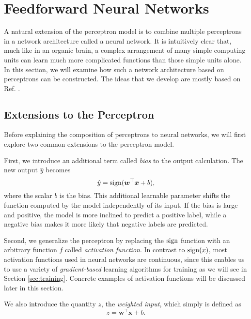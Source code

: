 \section{Feedforward Neural Networks}
\label{sec:feedforward_neural_networks}
A natural extension of the perceptron model is to combine multiple perceptrons in a network architecture called a neural network. It is intuitively clear that, much like in an organic brain, a complex arrangement of many simple computing units can learn much more complicated functions than those simple units alone. In this section, we will examine how such a network architecture based on perceptrons can be constructed. The ideas that we develop are mostly based on Ref. \cite[Ch.\,6]{DBLP:books/daglib/0040158}.

\subsection{Extensions to the Perceptron}
Before explaining the composition of perceptrons to neural networks, we will first explore two common extensions to the perceptron model.

First, we introduce an additional term called \emph{bias} to the output calculation. The new output $\hat{y}$ becomes
\begin{equation}\label{eq:perceptron2}
\hat{y} = \operatorname{sign}(\bm{w}^\top\bm{x} + b),
\end{equation}
where the scalar $b$ is the bias. This additional learnable parameter shifts the function computed by the model independently of its input. If the bias is large and positive, the model is more inclined to predict a positive label, while a negative bias makes it more likely that negative labels are predicted.

Second, we generalize the perceptron by replacing the $\operatorname{sign}$ function with an arbitrary function $f$ called \emph{activation function}. In contrast to $\operatorname{sign}(x)$, most activation functions used in neural networks are continuous, since this enables us to use a variety of \emph{gradient-based} learning algorithms for training as we will see in Section \ref{sec:training}. Concrete examples of activation functions will be discussed later in this section.

We also introduce the quantity $z$, the \emph{weighted input}, which simply is defined as
\begin{equation}\label{eq:perceptron3}
z = \bm{w}^\top\bm{x} + b.
\end{equation}

